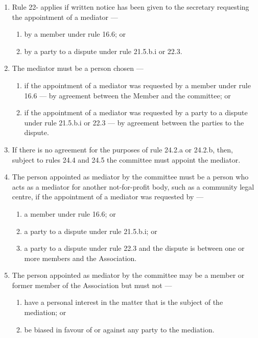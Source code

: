 \documentclass[../constitution.tex]{subfiles}
\begin{document}
\begin{enumerate}

\item Rule 22- applies if written notice has been given to the secretary requesting the appointment of a mediator ---

  \begin{enumerate}
  
  \item by a member under rule 16.6; or
  \item by a party to a dispute under rule 21.5.b.i or 22.3.
  \end{enumerate}
\item The mediator must be a person chosen ---

  \begin{enumerate}
  
  \item if the appointment of a mediator was requested by a member under rule 16.6 --- by agreement between the Member and the committee; or
  \item if the appointment of a mediator was requested by a party to a dispute under rule 21.5.b.i or 22.3 --- by agreement between the parties to the dispute.
  \end{enumerate}
\item If there is no agreement for the purposes of rule 24.2.a or 24.2.b, then, subject to rules 24.4 and 24.5 the committee must appoint the mediator.
\item The person appointed as mediator by the committee must be a person who acts as a mediator for another not-for-profit body, such as a community legal centre, if the appointment of a mediator was requested by ---

  \begin{enumerate}
  
  \item a member under rule 16.6; or
  \item a party to a dispute under rule 21.5.b.i; or
  \item a party to a dispute under rule 22.3 and the dispute is between one or more members and the Association.
  \end{enumerate}
\item The person appointed as mediator by the committee may be a member or former member of the Association but must not ---

  \begin{enumerate}
  
  \item have a personal interest in the matter that is the subject of the mediation; or
  \item be biased in favour of or against any party to the mediation.
  \end{enumerate}
\end{enumerate}
\end{document}
